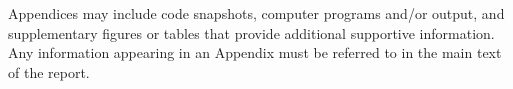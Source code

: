     Appendices may include code snapshots, computer programs and/or output, and supplementary figures or tables that provide additional supportive information. Any information appearing in an Appendix must be referred to in the main text of the report.
